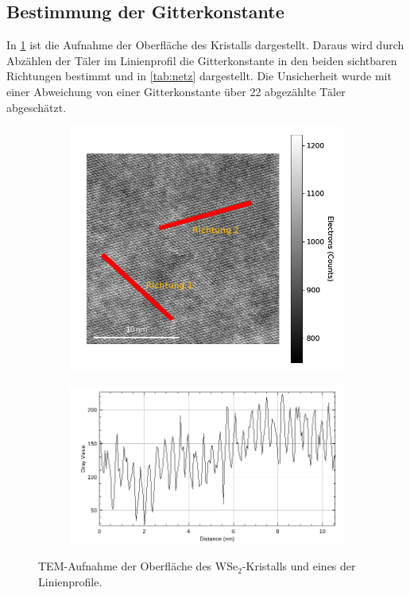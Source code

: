 
 \subsection{Bestimmung der Gitterkonstante}

 In \cref{fig:hrtem} ist die Aufnahme der Oberfläche des Kristalls dargestellt.
 Daraus wird durch Abzählen der Täler im Linienprofil die Gitterkonstante in den beiden sichtbaren Richtungen bestimmt und in \cref{tab:netz} dargestellt.
 Die Unsicherheit wurde mit einer Abweichung von einer Gitterkonstante über \SI{22}{} abgezählte Täler abgeschätzt.

	\begin{figure}[H]
		\centering
	\begin{subfigure}[b]{0.45\textwidth}
				\includegraphics[width= 1 \linewidth]{img/hrtem_richt}
				\caption{}
		\end{subfigure}
	\begin{subfigure}[b]{0.45\textwidth}
				\includegraphics[width= 1 \linewidth]{img/tem_line-Plot_hrtem_zoom_crop}
				\caption{}
		\end{subfigure}
		\label{fig:hrtem}
		\caption{
      TEM-Aufnahme der Oberfläche des WSe$_2$-Kristalls und eines der Linienprofile.
				}
	\end{figure}

